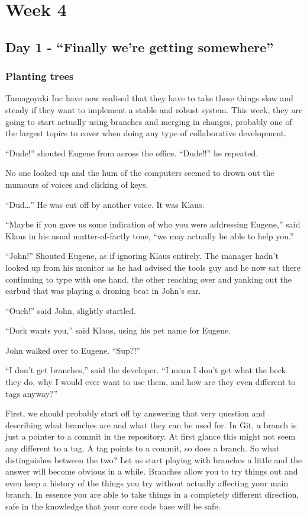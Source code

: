 \cleardoublepage
\chapter{Week 4}
\section{Day 1 - ``Finally we're getting somewhere''}
\subsection{Planting trees}

Tamagoyaki Inc have now realised that they have to take these things slow and steady if they want to implement a stable and robust system.
This week, they are going to start actually using branches and merging in changes, probably one of the largest topics to cover when doing any type of collaborative development.

\begin{trenches}
``Dude!'' shouted Eugene from across the office.
``Dude!!'' he repeated.

No one looked up and the hum of the computers seemed to drown out the mumours of voices and clicking of keys.

``Dud\ldots'' He was cut off by another voice.
It was Klaus.

``Maybe if you gave us some indication of who you were addressing Eugene,'' said Klaus in his usual matter-of-factly tone, ``we may actually be able to help you.''

``John!''  Shouted Eugene, as if ignoring Klaus entirely.
The manager hadn't looked up from his monitor as he had advised the tools guy and he now sat there continuing to type with one hand, the other reaching over and yanking out the earbud that was playing a droning beat in John's ear.

``Ouch!'' said John, slightly startled.

``Dork wants you,'' said Klaus, using his pet name for Eugene.

John walked over to Eugene.
``Sup?!''

``I don't get branches,'' said the developer.
``I mean I don't get what the heck they do, why I would ever want to use them, and how are they even different to tags anyway?''
\end{trenches}

First, we should probably start off by answering that very question and describing what branches are and what they can be used for.
In Git, a branch is just a pointer to a commit in the repository.
At first glance this might not seem any different to a tag.
A tag points to a commit, so does a branch.
So what distinguishes between the two?  Let us start playing with branches a little and the answer will become obvious in a while.
Branches allow you to try things out and even keep a history of the things you try without actually affecting your main branch.
In essence you are able to take things in a completely different direction, safe in the knowledge that your core code base will be safe.

